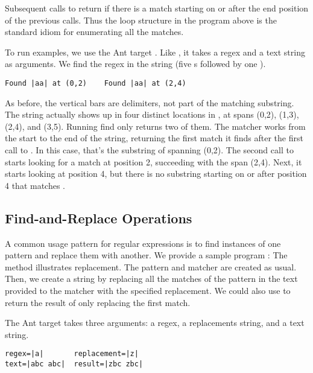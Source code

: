 Subsequent calls to  return  if there is a
match starting on or after the end position of the previous calls.
Thus the loop structure in the program above is the standard idiom
for enumerating all the matches.  

To run examples, we use the Ant target .
Like , it takes a regex and a text string as arguments.
We find the regex  in the string  (five s
followed by one ).
%
%
\begin{verbatim}
Found |aa| at (0,2)    Found |aa| at (2,4)
\end{verbatim}
%
As before, the vertical bars are delimiters, not part of the matching
substring.  The string  actually shows up in four
distinct locations in , at spans (0,2), (1,3),
(2,4), and (3,5).  Running find only returns two of them.  The matcher
works from the start to the end of the string, returning the first
match it finds after the first call to .  In this case,
that's the substring of  spanning (0,2).  The
second call to  starts looking for a match at position 2,
succeeding with the span (2,4).  Next, it starts looking at position
4, but there is no substring starting on or after position 4 that
matches .

\subsection{Find-and-Replace Operations}\label{section:regex-replace}

A common usage pattern for regular expressions is to find instances of
one pattern and replace them with another.  We provide a sample
program :
%
%
The  method illustrates replacement.
%
%
The pattern and matcher are created as usual.  Then, we create
a string by replacing all the matches of the pattern in the text
provided to the matcher with the specified replacement.  We could
also use  to return the result of only replacing
the first match.

The Ant target  takes three arguments:
a regex, a replacements string, and a text string.
%
\begin{verbatim}
regex=|a|       replacement=|z|
text=|abc abc|  result=|zbc zbc|
\end{verbatim}
%
